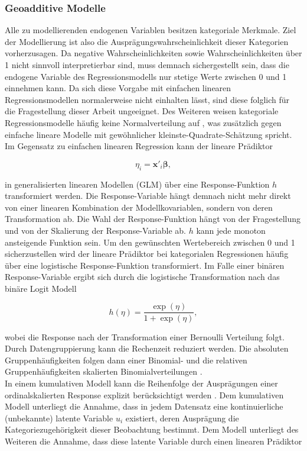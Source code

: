 \documentclass{Vorlage}
\begin{document}
\subsubsection{Geoadditive Modelle}
Alle zu modellierenden endogenen Variablen besitzen kategoriale Merkmale. Ziel der Modellierung ist also  die Ausprägungswahrscheinlichkeit dieser Kategorien vorherzusagen. Da negative Wahrscheinlichkeiten sowie Wahrscheinlichkeiten über 1 nicht sinnvoll interpretierbar sind, muss demnach sichergestellt sein, dass die endogene Variable des Regressionsmodells nur stetige Werte zwischen 0 und 1 einnehmen kann. Da sich diese Vorgabe mit einfachen linearen Regressionsmodellen normalerweise nicht einhalten lässt, sind diese folglich für die Fragestellung dieser Arbeit ungeeignet. Des Weiteren weisen kategoriale Regressionsmodelle häufig keine Normalverteilung auf \cite[p. 277]{fahrmeir2013regression}, was zusätzlich gegen einfache lineare Modelle mit gewöhnlicher kleinste-Quadrate-Schätzung spricht. Im Gegensatz zu einfachen linearen Regression kann der lineare Prädiktor


\begin{equation} \label{linPraed}
\eta_{i} =\mathbf{x}'_i \boldsymbol{\beta},
\end{equation}

in generalisierten linearen Modellen (GLM) über eine Response-Funktion $h$ transformiert werden. Die Response-Variable hängt demnach nicht mehr direkt von einer linearen Kombination der Modellkovariablen, sondern von deren Transformation ab. Die Wahl der Response-Funktion hängt von der Fragestellung und von der Skalierung der Response-Variable ab. $h$ kann jede monoton ansteigende Funktion sein. Um den gewünschten Wertebereich zwischen 0 und 1 sicherzustellen wird der lineare Prädiktor bei kategorialen Regressionen häufig über eine logistische Response-Funktion transformiert. Im Falle einer binären Response-Variable ergibt sich durch die logistische Transformation nach \cite[p. 270 f.]{fahrmeir2013regression} das binäre Logit Modell

\begin{equation} \label{logit}
h(\eta)=\frac{\exp(\eta)}{1+\exp(\eta)},
\end{equation}

wobei die Response nach der Transformation einer Bernoulli Verteilung folgt. Durch Datengruppierung kann die Rechenzeit reduziert werden. Die absoluten Gruppenhäufigkeiten folgen dann einer Binomial- und die relativen Gruppenhäufigkeiten skalierten Binomialverteilungen \cite[p. 277 f.]{fahrmeir2013regression}.\\
In einem kumulativen Modell kann die Reihenfolge der Ausprägungen einer ordinalskalierten Response explizit berücksichtigt werden \cite[p.334 ff.]{fahrmeir2013regression}. Dem kumulativen Modell unterliegt die Annahme, dass in jedem Datensatz eine kontinuierliche (unbekannte) latente Variable $u_i$ existiert, deren Ausprägung die Kategoriezugehörigkeit dieser Beobachtung bestimmt. Dem Modell unterliegt des Weiteren die Annahme, dass diese latente Variable durch einen linearen Prädiktor
\end{document}
